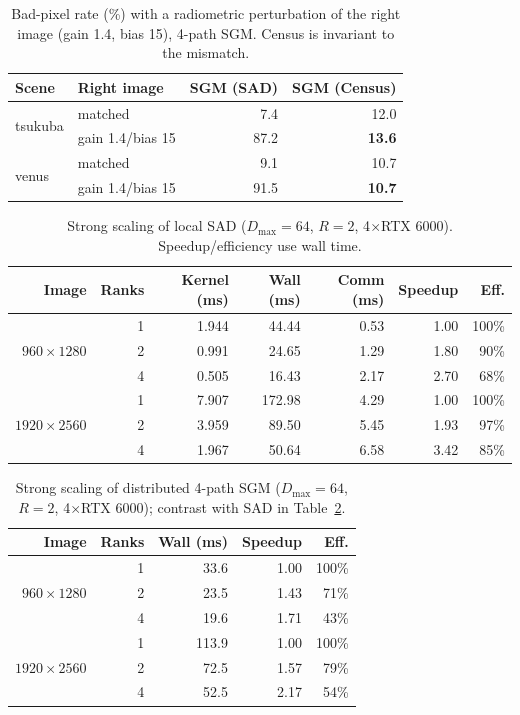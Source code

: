 \documentclass[11pt]{article}
\begin{document}
\begin{table}[H]
\centering
\caption{Bad-pixel rate (\%) with a radiometric perturbation of the right image
(gain 1.4, bias 15), 4-path SGM. Census is invariant to the mismatch.}
\label{tab:census}
\begin{tabular}{llrr}
\toprule
Scene & Right image & SGM (SAD) & SGM (Census)\\
\midrule
\multirow{2}{*}{tsukuba} & matched          & \phantom{0}7.4 & 12.0\\
                         & gain 1.4/bias 15 & 87.2 & \textbf{13.6}\\
\midrule
\multirow{2}{*}{venus}   & matched          & \phantom{0}9.1 & 10.7\\
                         & gain 1.4/bias 15 & 91.5 & \textbf{10.7}\\
\bottomrule
\end{tabular}
\end{table}

\begin{table}[H]
\centering
\caption{Strong scaling of local SAD ($D_{\max}{=}64$, $R{=}2$, 4$\times$RTX 6000).
Speedup/efficiency use wall time.}
\label{tab:strong}
\begin{tabular}{rrrrrrr}
\toprule
Image & Ranks & Kernel (ms) & Wall (ms) & Comm (ms) & Speedup & Eff.\\
\midrule
\multirow{3}{*}{$960\times1280$}
 & 1 & 1.944 & 44.44 & 0.53 & 1.00 & 100\%\\
 & 2 & 0.991 & 24.65 & 1.29 & 1.80 & \phantom{0}90\%\\
 & 4 & 0.505 & 16.43 & 2.17 & 2.70 & \phantom{0}68\%\\
\midrule
\multirow{3}{*}{$1920\times2560$}
 & 1 & 7.907 & 172.98 & 4.29 & 1.00 & 100\%\\
 & 2 & 3.959 & \phantom{0}89.50 & 5.45 & 1.93 & \phantom{0}97\%\\
 & 4 & 1.967 & \phantom{0}50.64 & 6.58 & 3.42 & \phantom{0}85\%\\
\bottomrule
\end{tabular}
\end{table}

\begin{table}[H]
\centering
\caption{Strong scaling of distributed 4-path SGM ($D_{\max}{=}64$, $R{=}2$,
4$\times$RTX 6000); contrast with SAD in Table~\ref{tab:strong}.}
\label{tab:sgmscale}
\begin{tabular}{rrrrr}
\toprule
Image & Ranks & Wall (ms) & Speedup & Eff.\\
\midrule
\multirow{3}{*}{$960\times1280$}
 & 1 & \phantom{0}33.6 & 1.00 & 100\%\\
 & 2 & \phantom{0}23.5 & 1.43 & \phantom{0}71\%\\
 & 4 & \phantom{0}19.6 & 1.71 & \phantom{0}43\%\\
\midrule
\multirow{3}{*}{$1920\times2560$}
 & 1 & 113.9 & 1.00 & 100\%\\
 & 2 & \phantom{0}72.5 & 1.57 & \phantom{0}79\%\\
 & 4 & \phantom{0}52.5 & 2.17 & \phantom{0}54\%\\
\bottomrule
\end{tabular}
\end{table}
\end{document}
